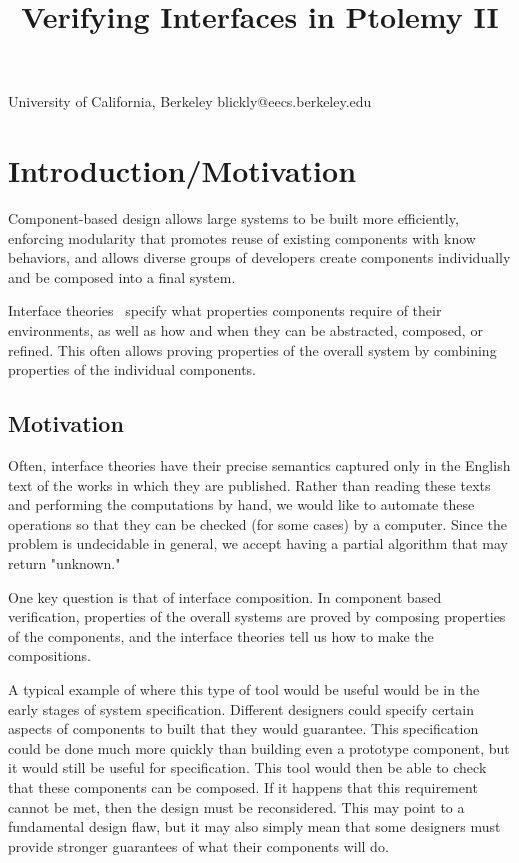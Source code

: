 \documentclass[preprint,11pt]{sigplanconf}
\begin{document}
\title{Verifying Interfaces in Ptolemy II}

           {University of California, Berkeley} {blickly@eecs.berkeley.edu}

\maketitle

\newcommand{\fixme}[1]{\textcolor{red}{(FIXME: #1)}}

\begin{abstract}
\end{abstract}

\section{Introduction/Motivation}
Component-based design allows large systems to be built more efficiently,
enforcing modularity that promotes reuse of existing components with
know behaviors, and allows diverse groups of developers create components
individually and be composed into a final system. 

Interface theories~\cite{interfaceTheories} specify what properties components
require of their environments, as well as how and when they can be abstracted,
composed, or refined.
This often allows proving
properties of the overall system by combining properties of the individual
components.

\subsection{Motivation}
Often, interface theories have their precise semantics captured only in the
English text of the works in which they are published. Rather than reading these
texts and performing the computations by hand, we would like to automate these
operations so that they can be checked (for some cases) by a computer. Since the
problem is undecidable in general, we accept having a partial algorithm that may
return "unknown."

One key question is that of interface composition.  In component based
verification, properties of the overall systems are proved by composing
properties of the components, and the interface theories tell us how to make
the compositions.

A typical example of where this type of tool would be useful would be in the
early stages of system specification. Different designers could specify certain
aspects of components to built that they would guarantee. This specification
could be done much more quickly than building even a prototype component, but
it would still be useful for specification. This tool would then be able to
check that these components can be composed. If it happens that this
requirement cannot be met, then the design must be reconsidered. This may point
to a fundamental design flaw, but it may also simply mean that some designers
must provide stronger guarantees of what their components will do.
\end{document}
